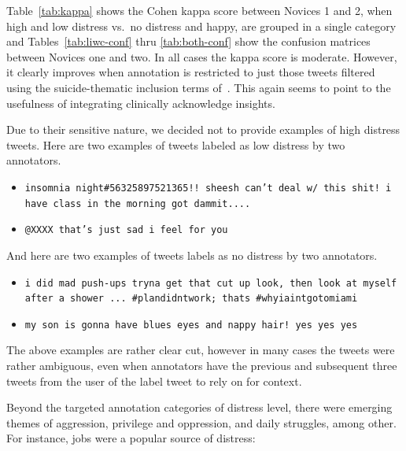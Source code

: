 \documentclass[11pt]{article}
\begin{document}
Table~\ref{tab:kappa} shows the Cohen kappa score between Novices 1 and 2, when high and low distress vs.\ no distress and happy, are grouped in a single category and Tables~\ref{tab:liwc-conf} thru \ref{tab:both-conf} show the confusion matrices between Novices one and two. In all cases the kappa score is moderate. However, it clearly improves when annotation is restricted to just those tweets filtered using the suicide-thematic inclusion terms of~. This again seems to point to the usefulness of integrating clinically acknowledge insights.




Due to their sensitive nature, we decided not to provide examples of high distress tweets. Here are two examples of tweets labeled as low distress by two annotators. 
\begin{itemize}
\footnotesize
\item \texttt{insomnia night\#56325897521365!! sheesh can't deal w/ this shit! i have class in the morning got dammit.... }

\item \texttt{@XXXX that's just sad i feel for you}
\end{itemize}

And here are two examples of tweets labels as no distress by two annotators.

\begin{itemize}
\footnotesize
\item \texttt{i did mad push-ups tryna get that cut up look, then look at myself after a shower ... \#plandidntwork; thats \#whyiaintgotomiami}

\item \texttt{my son is gonna have blues eyes and nappy hair! yes yes yes}
\end{itemize}

The above examples are rather clear cut, however in many cases the tweets were rather ambiguous, even when annotators have the previous and subsequent three tweets from the user of the label tweet to rely on for context. 

Beyond the targeted annotation categories of distress level, there were emerging themes of aggression, privilege and oppression, and daily struggles, among other.  For instance, jobs were a popular source of distress:
\end{document}
